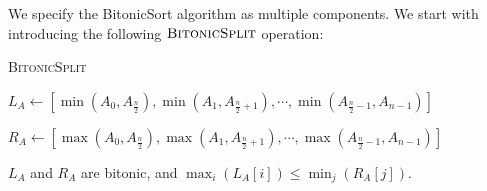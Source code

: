 We specify the BitonicSort algorithm as multiple components. We start with introducing the following $\textsc{BitonicSplit}$ operation:

\begin{algorithm}[h]
 \caption{\textsc{BitonicSplit}}


$L_A \gets [\min(A_0, A_{\frac{n}{2}}), \min(A_1, A_{\frac{n}{2}+1}), \cdots, \min(A_{\frac{n}{2}-1}, A_{n-1})]$\;

$R_A \gets [\max(A_0, A_{\frac{n}{2}}), \max(A_1, A_{\frac{n}{2}+1}), \cdots, \max(A_{\frac{n}{2}-1}, A_{n-1})]$\;

\;

\end{algorithm}

\begin{claim}\label{clm1}
    $L_A$ and $R_A$ are bitonic, and $\max_i (L_A[i]) \leq \min_j (R_A[j])$.
\end{claim}

